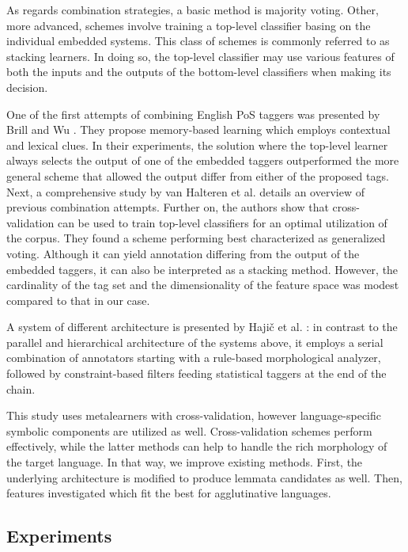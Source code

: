 As regards combination strategies, a basic method is majority voting.
Other, more advanced, schemes involve training a top-level classifier basing on the individual embedded systems.
This class of schemes is commonly referred to as stacking learners.
In doing so, the top-level classifier may use various features of both the inputs and the outputs of the bottom-level classifiers when making its decision. 

One of the first attempts of combining English PoS taggers was presented by Brill and Wu \cite{Brill1998}.
They propose memory-based learning which employs contextual and lexical clues.
In their experiments, the solution where the top-level learner always selects the output of one of the embedded taggers outperformed the more general scheme that allowed the output differ from either of the proposed tags.
Next, a comprehensive study by van Halteren et al. \cite{Halteren2001} details an overview of previous combination attempts.
Further on, the authors show that cross-validation can be used to train top-level classifiers for an optimal utilization of the corpus.
They found a scheme performing best characterized as generalized voting.
Although it can yield annotation differing from the output of the embedded taggers, it can also be interpreted as a stacking method.
However, the cardinality of the tag set and the dimensionality of the feature space was modest compared to that in our case.

A system of different architecture is presented by Hajič et al. \cite{Hajic2001}: in contrast to the parallel and hierarchical architecture of the systems above, it employs a serial combination of annotators starting with a rule-based morphological analyzer, followed by constraint-based filters feeding statistical taggers at the end of the chain. 

This study uses metalearners with cross-validation, however language-specific symbolic components are utilized as well. 
Cross-validation schemes \cite{Brill1998,Halteren2001} perform effectively, while the latter methods can help to handle the rich morphology of the target language.
In that way, we improve existing methods. 
First, the underlying architecture is modified to produce lemmata candidates as well.
Then, features investigated which fit the best for agglutinative languages.

\subsection{Experiments}

